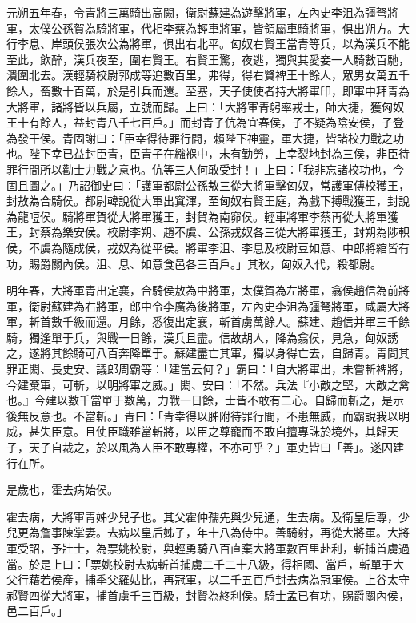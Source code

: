 \begin{pinyinscope}
元朔五年春，令青將三萬騎出高闕，衛尉蘇建為遊擊將軍，左內史李沮為彊弩將軍，太僕公孫賀為騎將軍，代相李蔡為輕車將軍，皆領屬車騎將軍，俱出朔方。大行李息、岸頭侯張次公為將軍，俱出右北平。匈奴右賢王當青等兵，以為漢兵不能至此，飲醉，漢兵夜至，圍右賢王。右賢王驚，夜逃，獨與其愛妾一人騎數百馳，潰圍北去。漢輕騎校尉郭成等追數百里，弗得，得右賢裨王十餘人，眾男女萬五千餘人，畜數十百萬，於是引兵而還。至塞，天子使使者持大將軍印，即軍中拜青為大將軍，諸將皆以兵屬，立號而歸。上曰：「大將軍青躬率戎士，師大捷，獲匈奴王十有餘人，益封青八千七百戶。」而封青子伉為宜春侯，子不疑為陰安侯，子登為發干侯。青固謝曰：「臣幸得待罪行間，賴陛下神靈，軍大捷，皆諸校力戰之功也。陛下幸已益封臣青，臣青子在繈褓中，未有勤勞，上幸裂地封為三侯，非臣待罪行間所以勸士力戰之意也。伉等三人何敢受封！」上曰：「我非忘諸校功也，今固且圖之。」乃詔御史曰：「護軍都尉公孫敖三從大將軍擊匈奴，常護軍傅校獲王，封敖為合騎侯。都尉韓說從大軍出窴渾，至匈奴右賢王庭，為戲下搏戰獲王，封說為龍哣侯。騎將軍賀從大將軍獲王，封賀為南窌侯。輕車將軍李蔡再從大將軍獲王，封蔡為樂安侯。校尉李朔、趙不虞、公孫戎奴各三從大將軍獲王，封朔為陟軹侯，不虞為隨成侯，戎奴為從平侯。將軍李沮、李息及校尉豆如意、中郎將綰皆有功，賜爵關內侯。沮、息、如意食邑各三百戶。」其秋，匈奴入代，殺都尉。

明年春，大將軍青出定襄，合騎侯敖為中將軍，太僕賀為左將軍，翕侯趙信為前將軍，衛尉蘇建為右將軍，郎中令李廣為後將軍，左內史李沮為彊弩將軍，咸屬大將軍，斬首數千級而還。月餘，悉復出定襄，斬首虜萬餘人。蘇建、趙信并軍三千餘騎，獨逢單于兵，與戰一日餘，漢兵且盡。信故胡人，降為翕侯，見急，匈奴誘之，遂將其餘騎可八百奔降單于。蘇建盡亡其軍，獨以身得亡去，自歸青。青問其罪正閎、長史安、議郎周霸等：「建當云何？」霸曰：「自大將軍出，未嘗斬裨將，今建棄軍，可斬，以明將軍之威。」閎、安曰：「不然。兵法『小敵之堅，大敵之禽也。』今建以數千當單于數萬，力戰一日餘，士皆不敢有二心。自歸而斬之，是示後無反意也。不當斬。」青曰：「青幸得以胏附待罪行間，不患無威，而霸說我以明威，甚失臣意。且使臣職雖當斬將，以臣之尊寵而不敢自擅專誅於境外，其歸天子，天子自裁之，於以風為人臣不敢專權，不亦可乎？」軍吏皆曰「善」。遂囚建行在所。

是歲也，霍去病始侯。

霍去病，大將軍青姊少兒子也。其父霍仲孺先與少兒通，生去病。及衛皇后尊，少兒更為詹事陳掌妻。去病以皇后姊子，年十八為侍中。善騎射，再從大將軍。大將軍受詔，予壯士，為票姚校尉，與輕勇騎八百直棄大將軍數百里赴利，斬捕首虜過當。於是上曰：「票姚校尉去病斬首捕虜二千二十八級，得相國、當戶，斬單于大父行藉若侯產，捕季父羅姑比，再冠軍，以二千五百戶封去病為冠軍侯。上谷太守郝賢四從大將軍，捕首虜千三百級，封賢為終利侯。騎士孟已有功，賜爵關內侯，邑二百戶。」


\end{pinyinscope}
